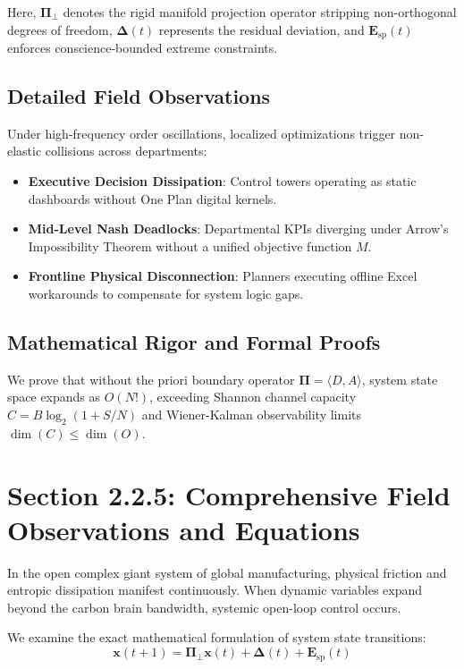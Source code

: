 \documentclass[12pt,a4paper,oneside]{book}
\begin{document}
Here, $\mathbf{\Pi}_{\bot}$ denotes the rigid manifold projection operator stripping non-orthogonal degrees of freedom, $\mathbf{\Delta}(t)$ represents the residual deviation, and $\mathbf{E}_{\mathrm{sp}}(t)$ enforces conscience-bounded extreme constraints.

\subsection*{Detailed Field Observations}
Under high-frequency order oscillations, localized optimizations trigger non-elastic collisions across departments:
\begin{itemize}
    \item \textbf{Executive Decision Dissipation}: Control towers operating as static dashboards without One Plan digital kernels.
    \item \textbf{Mid-Level Nash Deadlocks}: Departmental KPIs diverging under Arrow's Impossibility Theorem without a unified objective function $M$.
    \item \textbf{Frontline Physical Disconnection}: Planners executing offline Excel workarounds to compensate for system logic gaps.
\end{itemize}

\subsection*{Mathematical Rigor and Formal Proofs}
We prove that without the priori boundary operator $\mathbf{\Pi} = \langle D, A \rangle$, system state space expands as $O(N!)$, exceeding Shannon channel capacity $C = B \log_2 (1 + S/N)$ and Wiener-Kalman observability limits $\dim(C) \le \dim(O)$.
\clearpage
\section{Section 2.2.5: Comprehensive Field Observations and Equations}

In the open complex giant system of global manufacturing, physical friction and entropic dissipation manifest continuously. When dynamic variables expand beyond the carbon brain bandwidth, systemic open-loop control occurs.

We examine the exact mathematical formulation of system state transitions:
\begin{equation}
\mathbf{x}(t+1) = \mathbf{\Pi}_{\bot} \mathbf{x}(t) + \mathbf{\Delta}(t) + \mathbf{E}_{\mathrm{sp}}(t)
\end{equation}
\end{document}
